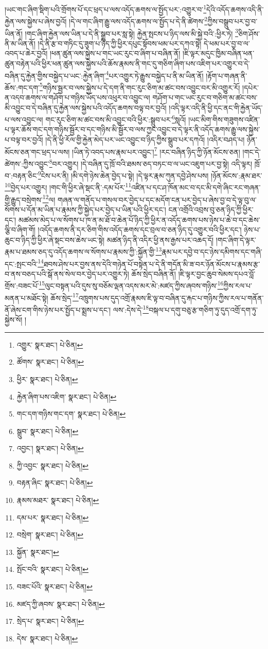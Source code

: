 །ཡང་གང་ཞིག་སྡིག་པའི་གྲོགས་པོ་དང་ཕྲད་པ་ལས་འདོད་ཆགས་ལ་སྤྱོད་པར་:འགྱུར་བ་\footnote{འགྱུར་  སྣར་ཐང་།  པེ་ཅིན། }དེའི་འདོད་ཆགས་འདི་ནི་རྐྱེན་ལས་སྐྱེས་པ་ཞེས་བྱའོ། །དེ་ལ་གང་ཞིག་རྒྱུ་ལས་འདོད་ཆགས་ལ་སྤྱོད་པ་དེ་ནི་ཚེགས་\footnote{ཚོགས་  སྣར་ཐང་།  པེ་ཅིན། }ཀྱིས་བསྒྲུབ་པར་བྱ་བ་ཡིན་ནོ། །གང་ཞིག་རྐྱེན་ལས་ཡིན་པ་དེ་ནི་སྒྲུབ་པར་སླ་སྟེ། རྐྱེན་སྤངས་པ་ཉིད་ལས་མི་སྐྱེ་བའི་:ཕྱིར་ཏེ། \footnote{ཕྱིར་  སྣར་ཐང་།  པེ་ཅིན། }ཅིག་ཤོས་ནི་མ་ཡིན་ནོ། །དེ་ནི་རྩ་བ་གཏིང་དུ་ཟུག་པ་ཉིད་ཀྱི་ཕྱིར་དཔུང་སྟོབས་ཕམ་པར་དཀའ་སྟེ། དེ་ཕམ་པར་བྱ་བ་ལ་འབད་པ་ཆེར་བྱའོ། །ཕན་ཚུན་ལས་སྐྱེས་པ་གང་ཡང་རུང་བ་ཞིག་པ་བཞིན་ནོ། །ཇི་ལྟར་མདུང་ཁྱིམ་བཞིན་ཕན་ཚུན་བརྟེན་པའི་ཕྱིར་ཕན་ཚུན་ལས་སྐྱེས་པའི་ཆོས་རྣམས་ནི་གང་དུ་གཅིག་ཞིག་པས་འཇིག་པར་འགྱུར་བ་དེ་བཞིན་དུ་རྐྱེན་གྱིས་བསྐྱེད་པ་ཡང་:རྐྱེན་ཞིག་\footnote{རྐྱེན་ཞིག་པས་འཇིག་  སྣར་ཐང་།  པེ་ཅིན། }པར་འགྱུར་ཏེ་རྒྱུས་བསྐྱེད་པ་ནི་མ་ཡིན་ནོ། །རྟོག་པ་གཞན་ནི་ཆོས་:གང་དག་\footnote{གང་དག་གཉིས་གང་དག་  སྣར་ཐང་།  པེ་ཅིན། }གཉིས་སྦྱར་བ་ལས་སྐྱེས་པ་དེ་དག་ནི་གང་རུང་ཅིག་མ་ཚང་བས་འབྱུང་བར་མི་འགྱུར་རོ། །དཔེར་ན་འདབ་ཆགས་ལ་གཤོག་པ་གཉིས་ཡོད་པས་འཕུར་བ་འབྱུང་ལ། གཤོག་པ་གང་ཡང་རུང་བ་གཅིག་མ་ཚང་བས་མི་འབྱུང་བ་དེ་བཞིན་དུ་རྐྱེན་ལས་སྐྱེས་པའི་འདོད་ཆགས་བལྟ་བར་བྱའོ། །འདི་ལྟར་འདི་ནི་ཕྱི་དང་ནང་གི་རྐྱེན་ཡོད་པ་ལས་འབྱུང་ལ། གང་རུང་ཅིག་མ་ཚང་བས་མི་འབྱུང་བའི་ཕྱིར་:སྒྲུབ་པར་\footnote{སྒྲུབ་  སྣར་ཐང་།  པེ་ཅིན། }སླའོ། །ཡང་མིག་གིས་གཟུགས་འཛིན་པ་ལྟར་ཆོས་གང་དག་གཉིས་སྦྱོར་བ་དང་གཉིས་མི་སྦྱོར་བ་ལས་ཀྱང་འབྱུང་བ་དེ་ལྟར་ནི་འདོད་ཆགས་རྒྱུ་ལས་སྐྱེས་པ་བལྟ་བར་བྱའོ། །དེ་ནི་ཕྱི་རོལ་གྱི་རྐྱེན་མེད་པར་ཡང་འབྱུང་བ་ཉིད་ཀྱིས་སྒྲུབ་པར་དཀའོ། །འདིར་བཤད་པ། ཉོན་མོངས་ཅན་གང་ཕྲད་པ་ལས། །ཡིན་ཏེ་འབད་པས་རྣམ་པར་འབྱུང་།\footnote{འབྱང་།  སྣར་ཐང་།  པེ་ཅིན། } །རང་བཞིན་ཉིད་ཀྱི་ཉོན་མོངས་ཅན། །གང་དེ་ཚེགས་:ཀྱིས་འབྱུང་\footnote{ཀྱི་འབྱང་  སྣར་ཐང་།  པེ་ཅིན། }བར་འགྱུར། །དེ་བཞིན་དུ་ཁྲོ་བའི་ཐམས་ཅད་བཏང་བ་ལ་ཡང་འཇུག་པར་བྱ་སྟེ། འདི་ལྟར། ཁྲོ་བ་:བརྟན་ཅིང་\footnote{བརྟན་ཞིང་  སྣར་ཐང་།  པེ་ཅིན། }ངེས་པར་ནི། །མི་དགེ་ཉེས་ཆེན་བྱེད་པ་སྟེ། །དེ་ལྟར་རྣམ་ཀུན་དབྱེ་ཤེས་པས། །ཉོན་མོངས་:རྣམ་ཐར་\footnote{རྣམས་མཐར་  སྣར་ཐང་།  པེ་ཅིན། }བྱེད་པར་འགྱུར། །གང་གི་ཕྱིར་ཞེ་སྡང་ནི་:དམ་པོར་\footnote{དམ་པར་  སྣར་ཐང་།  པེ་ཅིན། }འཛིན་པ་དང་ཤ་ཁོན་མང་བ་དང་མི་དགེ་ཞིང་རང་གཞན་གྱི་རྒྱུད་བསྲེགས་\footnote{བསྲེག་  སྣར་ཐང་།  པེ་ཅིན། }ལ། གཞན་ལ་གནོད་པ་གསལ་བར་བྱེད་པ་དང་མདོག་ངན་པར་བྱེད་པ་ཞེས་བྱ་བ་དེ་ལྟ་བུ་ལ་སོགས་པ་དོན་མ་ཡིན་པ་རྣམས་ཀྱི་སྐྱེད་པར་བྱེད་པ་ཡིན་པའི་ཕྱིར་དང་། ངན་འགྲོའི་འབྲས་བུ་ཅན་ཉིད་ཀྱི་ཕྱིར་དང་། མཚམས་མེད་པ་ལ་སོགས་པ་ཁ་ན་མ་ཐོ་བ་ཆེན་པོ་ཉིད་ཀྱི་ཕྱིར་ན་འདོད་ཆགས་པས་ཉེས་པ་ཆེ་བ་དང་ཆེས་ལྕི་བ་ཞིག་གོ། །འདོད་ཆགས་ནི་དར་ཅིག་གིས་འདོད་ཆགས་དང་བྲལ་བ་ཅན་ཉིད་དུ་འགྱུར་བའི་ཕྱིར་དང་། ཉེས་པ་ཆུང་བ་ཉིད་ཀྱི་ཕྱིར་ཞེ་སྡང་བས་ཆེས་ཡང་སྟེ། མཚན་ཉིད་ནི་འདིར་ཕྱི་ནས་རྒྱས་པར་འཆད་དོ། །གང་ཞིག་དེ་ལྟར་རྣམ་པ་ཐམས་ཅད་དུ་འདོད་ཆགས་ལ་སོགས་པ་རྣམས་ཀྱི་:སྐྱོན་གྱི་\footnote{སྐྱོན་  སྣར་ཐང་། }རྣམ་པར་དབྱེ་བ་དང་ཉེས་དམིགས་དང་གཞི་དང་:སྤང་བའི་\footnote{སྤོང་བའི་  སྣར་ཐང་།  པེ་ཅིན། }ཐབས་ཤེས་པར་བྱས་ནས་དེའི་གཉེན་པོ་བསྟེན་པ་དེ་ནི་གདོན་མི་ཟ་བར་ཉོན་མོངས་པ་རྣམས་རྩ་བ་ནས་བཅད་པའི་སྒོ་ནས་སེལ་བར་བྱེད་པར་འགྱུར་ཏེ། ཆོས་སྲེད་བཞིན་ནོ། །ཇི་ལྟར་བྱང་ཆུབ་སེམས་དཔའ་བློ་གྲོས་:བཟང་པོ་\footnote{བཟང་པོའི་  སྣར་ཐང་།  པེ་ཅིན། }ལུང་བསྟན་པའི་དུས་སུ་བཅོམ་ལྡན་འདས་མར་མེ་:མཛད་ཀྱིས་ཞབས་གཉིས་\footnote{མཛད་ཀྱི་ཞབས་  སྣར་ཐང་།  པེ་ཅིན། }ཀྱིས་རལ་པ་མནན་པ་མཐོང་སྟེ། ཆོས་སྲེད་\footnote{སྲེད་པ་  སྣར་ཐང་།  པེ་ཅིན། }འཁྲུགས་པས་དུད་འགྲོ་རྣམས་ཇི་ལྟ་བ་བཞིན་དུ་རྐང་པ་གཉིས་ཀྱིས་རལ་པ་གནོན་ནོ་ཞེས་ངག་གིས་ཉེས་པར་སྤྱོད་པ་སྨྲས་པ་དང་། ལས་:དེས་དེ་\footnote{དེས་  སྣར་ཐང་།  པེ་ཅིན། }བསྐལ་པ་དགུ་བཅུ་རྩ་གཅིག་ཏུ་དུད་འགྲོ་དག་ཏུ་སྐྱེས་སོ། །
